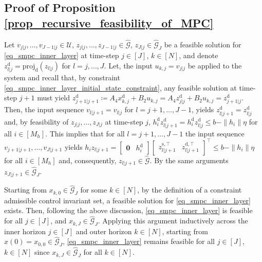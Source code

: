 \documentclass{IEEEtran}
\begin{document}
\begin{appendices}
\section{Proof of Proposition \ref{prop_recursive_feasibility_of_MPC}}
\label{app_proof_prop_recursive_feasibility_of_MPC}


Let $v_{j|j},\dots, v_{J-1|j}\in\mathcal{U}$, $z_{j|j},\dots, z_{J-1|j}\in\hat{\mathcal{G}}$, $z_{J|j}\in\hat{\mathcal{G}}_J$ be a feasible solution for \eqref{eq_smpc_inner_layer} at time-step $j\in[J]$, $k\in[N]$, and denote $z_{l|j}^{\text{d}}=\text{proj}_{\text{d}}(z_{l|j})$ for $l=j,\dots,J$. Let, the input $u_{k,j}=v_{j|j}$ be applied to the system and recall that, by constraint \eqref{eq_smpc_inner_layer_initial_state_constraint}, any feasible solution at time-step $j+1$ must yield $z_{j+1|j+1}^{\text{d}}\coloneqq A_4x_{k,j}^{\text{d}}+B_2u_{k,j}=A_4z_{j|j}^{\text{d}}+B_2u_{k,j}=z_{j+1|j}^{\text{d}}$. Then, the input sequence $v_{l|j+1}=v_{l|j}$ for $l=j+1,\dots,J-1$, yields $z_{l|j+1}^{\text{d}}=z_{l|j}^{\text{d}}$ and, by feasibility of $z_{j|j},\dots, z_{J|j}$ at time-step $j$, $h_i^{\text{d}}z_{l|j+1}^{\text{d}} = h_i^{\text{d}}z_{l|j}^{\text{d}} \leq b -\|h_i\|\eta$ for all $i\in[M_h]$. This implies that for all $l=j+1,\dots,J-1$ the input sequence $v_{j+1|j+1},\dots,v_{J|j+1}$ yields  $h_iz_{l|j+1}=\begin{bmatrix}
    \textbf{0} & h_i^{\text{d}}
\end{bmatrix}\begin{bmatrix}
    z_{l|j+1}^{\text{s},\top} & z_{l|j+1}^{\text{d},\top} 
\end{bmatrix}^{\top}\leq b-\|h_i\|\eta$ for all $i\in[M_h]$ and, consequently, $z_{l|j+1}\in\hat{\mathcal{G}}$. By the same arguments $z_{J|j+1}\in\hat{\mathcal{G}}_J$. 

Starting from $x_{k,0}\in\hat{\mathcal{G}}_J$ for some $k\in[N]$, by the definition of a constraint admissible control invariant set, a feasible solution for \eqref{eq_smpc_inner_layer} exists. Then, following the above discussion, \eqref{eq_smpc_inner_layer} is feasible for all $j\in[J]$, and $x_{k,J}\in\hat{\mathcal{G}}_J$. Applying this argument inductively across the inner horizon $j \in [J]$ and outer horizon $k \in [N]$, starting from $x(0)=x_{0,0}\in\hat{\mathcal{G}}_J$, \eqref{eq_smpc_inner_layer} remains feasible for all $j\in[J]$, $k\in[N]$ since $x_{k,J}\in\hat{\mathcal{G}}_J$ for all $k\in[N]$. 


\end{appendices}
\end{document}

